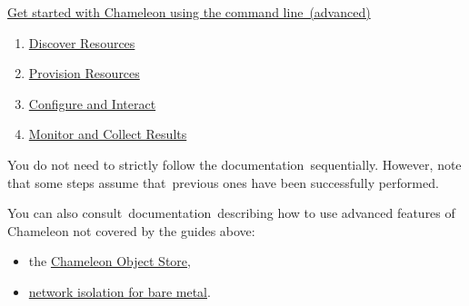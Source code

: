 \href{https://www.chameleoncloud.org/discover-resources-command-lines}{Get
started with Chameleon using the command line~(advanced)}

\begin{enumerate}
\tightlist
\item
  \href{https://www.chameleoncloud.org/discover-resources-command-lines/}{Discover
  Resources}
\item
  \href{https://www.chameleoncloud.org/advanced-provision-resources/}{Provision
  Resources}
\item
  \href{https://www.chameleoncloud.org/advanced-configure-and-interact/}{Configure
  and Interact}
\item
  \href{https://www.chameleoncloud.org/monitor-and-collect/}{Monitor and
  Collect Results}
\end{enumerate}

You do not need to strictly follow the documentation~sequentially.
However, note that some steps assume that~previous ones have been
successfully performed.

You can also consult~documentation~describing how to use advanced
features of Chameleon not covered by the guides above:

\begin{itemize}
\tightlist
\item
  the
  \href{https://www.chameleoncloud.org/docs/bare-metal-user-guide/chameleon-object-store/}{Chameleon
  Object Store},
\item
  \href{https://www.chameleoncloud.org/docs/bare-metal-user-guide/network-isolation-bare-metal/}{network
  isolation for bare metal}.
\end{itemize}


